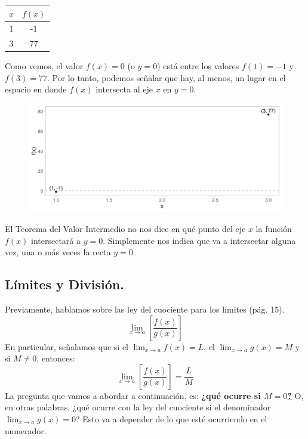 \documentclass[12pt]{article}
\begin{document}
\begin{center}
\begin{tabular}{c | c}

$x$ & $f(x)$\\
\hline
1 & -1\\
3 & 77\\

\end{tabular}
\end{center}

Como vemos, el valor $f(x) = 0$ (o $y = 0$) está entre los valores $f(1) = -1$ y $f(3) = 77$. Por lo tanto, podemos señalar que hay, al menos, un lugar en el espacio en donde $f(x)$ intersecta al eje $x$ en $y = 0$.
\newpage
\begin{figure}[hbt!]
\centering
\includegraphics[scale=0.7]{img/interm_value_plot.jpg}
\end{figure}

El Teorema del Valor Intermedio no nos dice en qué punto del eje $x$ la función $f(x)$ intersectará a $y = 0$. Simplemente nos indica que va a intersectar alguna vez, una o más veces la recta $y = 0$.


\subsection{Límites y División.}

Previamente, hablamos sobre las ley del cuociente para los límites (pág. 15).
\[\lim_{x \to a} \left[\frac{f(x)}{g(x)}\right]\]
En particular, señalamos que si el $\lim_{x \to a} f(x) = L$, el $\lim_{x \to a} g(x) = M$ y si $M \neq 0$, entonces:
\[\lim_{x \to a} \left[\frac{f(x)}{g(x)}\right] = \frac{L}{M}\]
La pregunta que vamos a abordar a continuación, es: \textbf{¿qué ocurre si \underline{$M = 0$?}} O, en otras palabras, ¿qué ocurre con la ley del cuociente si el denominador $\lim_{x \to a} g(x) = 0$? Esto va a depender de lo que esté ocurriendo en el numerador.
\end{document}
